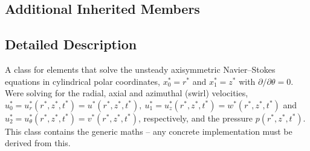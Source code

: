 \subsection*{Additional Inherited Members}


\subsection{Detailed Description}
A class for elements that solve the unsteady axisymmetric Navier--Stokes equations in cylindrical polar coordinates, $ x_0^* = r^*$ and $ x_1^* = z^* $ with $ \partial / \partial \theta = 0 $. We\textquotesingle{}re solving for the radial, axial and azimuthal (swirl) velocities, $ u_0^* = u_r^*(r^*,z^*,t^*) = u^*(r^*,z^*,t^*), \ u_1^* = u_z^*(r^*,z^*,t^*) = w^*(r^*,z^*,t^*)$ and $ u_2^* = u_\theta^*(r^*,z^*,t^*) = v^*(r^*,z^*,t^*) $, respectively, and the pressure $ p(r^*,z^*,t^*) $. This class contains the generic maths -- any concrete implementation must be derived from this.

